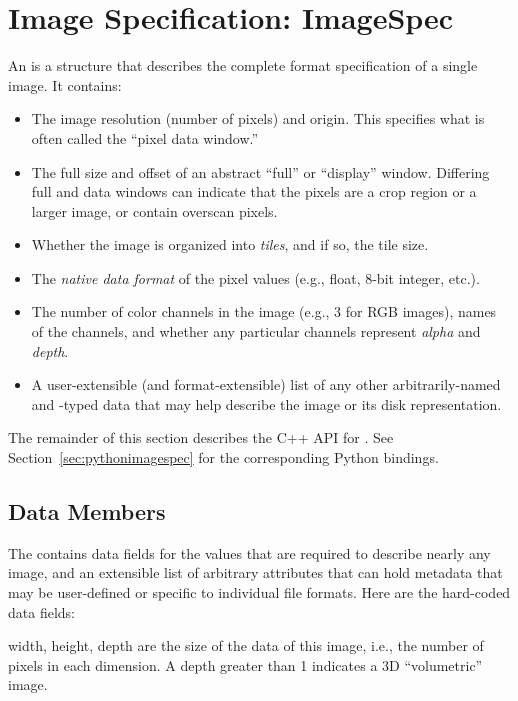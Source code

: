 \section{Image Specification: {\cf ImageSpec}}
\label{sec:ImageSpec}

An \ImageSpec is a structure that describes the complete
format specification of a single image.  It contains:

\begin{itemize}
\item The image resolution (number of pixels) and origin. This specifies
  what is often called the ``pixel data window.''
\item The full size and offset of an abstract ``full'' or ``display''
  window. Differing full and data windows can indicate that the pixels
  are a crop region or a larger image, or contain overscan pixels.
\item Whether the image is organized into \emph{tiles}, and if so, the
  tile size.
\item The \emph{native data format} of the pixel values (e.g., float, 8-bit
  integer, etc.).
\item The number of color channels in the image (e.g., 3 for RGB
  images), names of the channels, and whether any particular channels
  represent \emph{alpha} and \emph{depth}.
\item A user-extensible (and format-extensible) list of any other
  arbitrarily-named and -typed data that may help describe the image or
  its disk representation.
\end{itemize}

The remainder of this section describes the C++ API for \ImageSpec.
See Section~\ref{sec:pythonimagespec} for the corresponding Python
bindings.

\subsection{\ImageSpec Data Members}

The \ImageSpec contains data fields for the values that are
required to describe nearly any image, and an extensible list of
arbitrary attributes that can hold metadata that may be user-defined or
specific to individual file formats.  Here are the hard-coded data
fields:


{\cf width, height, depth} are the size of the data of this image, i.e.,
the number of pixels in each dimension.  A {\cf depth} greater than 1
indicates a 3D ``volumetric'' image.

